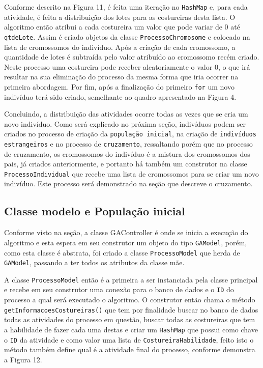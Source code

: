 \newpage
 
\par Conforme descrito na Figura 11, é feita uma iteração no
\texttt{HashMap} e, para cada atividade, é feita a distribuição dos lotes para
as costureiras desta lista. O algoritmo então atribui a cada costureira um valor
que pode variar de 0 até \texttt{qtdeLote}.
Assim é criado objetos da classe \texttt{ProcessoChromosome} e colocado na lista
de cromossomos do indivíduo. Após a criação de cada cromossomo, a quantidade de
lotes é subtraída pelo valor atribuído ao cromossomo recém criado.
Neste processo uma costureira pode receber aleatoriamente o valor 0, o que irá resultar na sua eliminação do processo da mesma forma
que iria ocorrer na primeira abordagem. Por fim, após a finalização do primeiro
\texttt{for} um novo indivíduo terá sido criado, semelhante ao quadro
apresentado na Figura 4.

\par Concluindo, a distribuição das atividades ocorre todas as vezes que se cria um novo indivíduo.
Como será explicado no próxima seção, indivíduos podem ser criados no processo
de criação da \texttt{população inicial}, na criação de \texttt{indivíduos estrangeiros} e no processo de \texttt{cruzamento}, ressaltando porém que no processo 
de cruzamento, os cromossomos do indivíduo é a mistura dos cromossomos dos pais,
já criados anteriormente, e portanto há também um construtor na classe \texttt{ProcessoIndividual} que recebe uma lista de cromossomos para se criar um novo indivíduo.
Este processo será demonstrado na seção que descreve o cruzamento.

\subsection {Classe modelo e População inicial}

\par Conforme visto na seção, a classe GAController é onde se inicia a execução do algoritmo e esta espera em seu 
construtor um objeto do tipo \texttt{GAModel}, porém, como esta classe é abstrata, foi criado a classe 
\texttt{ProcessoModel} que herda de \texttt{GAModel}, passando a ter todos os atributos
da classe mãe.

\par A classe \texttt{ProcessoModel} então é a primeira a ser instanciada pela classe principal e recebe em seu construtor
uma conexão para o banco de dados e o \texttt{ID} do processo a qual será
executado o algoritmo. O construtor então chama o método
\texttt{getInformacoesCostureiras()} que tem por finalidade buscar no banco de dados todas as atividades do 
processo em questão, buscar todas as costureiras que tem a habilidade de fazer
cada uma destas e criar um \texttt{HashMap} que possui como chave o \texttt{ID} da atividade e como valor uma 
lista de \texttt{CostureiraHabilidade}, feito isto o método 
também define qual é a atividade final do processo, conforme demonstra a Figura 12.



